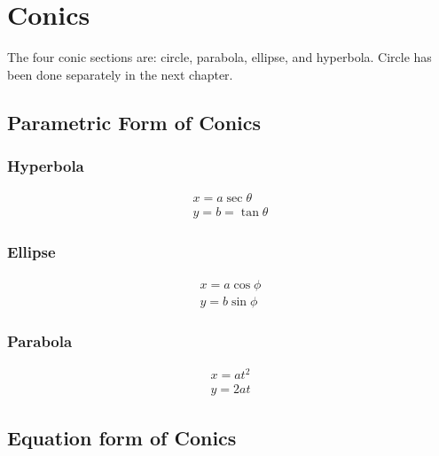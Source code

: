 \documentclass[../main.tex]{subfile}
\begin{document}
    \chapter{Conics}
    The four conic sections are: circle, parabola, ellipse, and hyperbola. Circle has been done separately in the next chapter.

    \section{Parametric Form of Conics}
    \subsection{Hyperbola}
    \begin{align}
        x=a\sec \theta\\
        y=b=\tan \theta
    \end{align}

    \subsection{Ellipse}
    \begin{align}
        x=a\cos\phi\\
        y=b\sin\phi
        \end{align}
        \subsection{Parabola}
        \begin{align}
        x=at^2\\
        y=2at
    \end{align}

    \section{Equation form of Conics}
\end{document}
